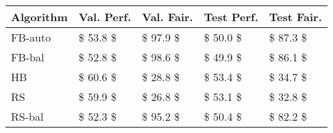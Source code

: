 \begin{tabular}{lllll}
\toprule
Algorithm & Val. Perf. & Val. Fair. & Test Perf. & Test Fair. \\
\midrule
  FB-auto &   \$ 53.8 \$ &   \$ 97.9 \$ &   \$ 50.0 \$ &   \$ 87.3 \$ \\
   FB-bal &   \$ 52.8 \$ &   \$ 98.6 \$ &   \$ 49.9 \$ &   \$ 86.1 \$ \\
       HB &   \$ 60.6 \$ &   \$ 28.8 \$ &   \$ 53.4 \$ &   \$ 34.7 \$ \\
       RS &   \$ 59.9 \$ &   \$ 26.8 \$ &   \$ 53.1 \$ &   \$ 32.8 \$ \\
   RS-bal &   \$ 52.3 \$ &   \$ 95.2 \$ &   \$ 50.4 \$ &   \$ 82.2 \$ \\
\bottomrule
\end{tabular}
